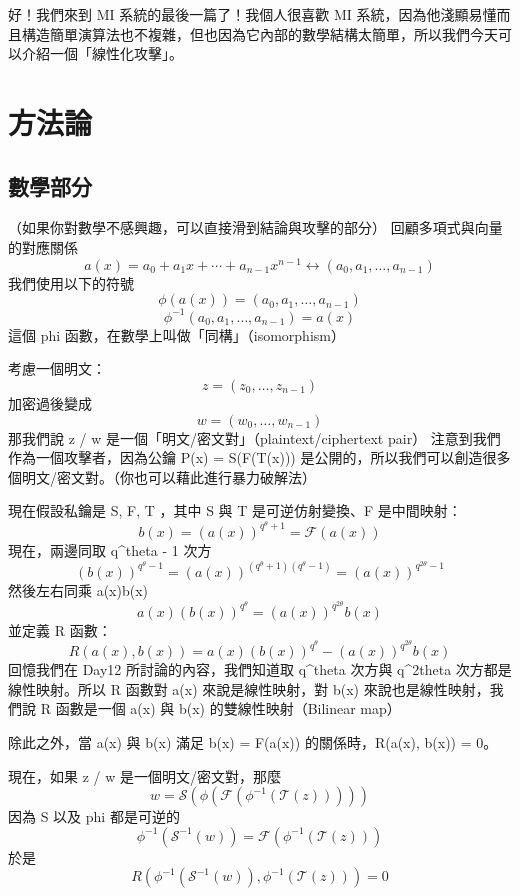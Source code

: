 \documentclass[
]{article}
\author{}
\date{}
\begin{document}
好！我們來到 MI 系統的最後一篇了！我個人很喜歡 MI
系統，因為他淺顯易懂而且構造簡單演算法也不複雜，但也因為它內部的數學結構太簡單，所以我們今天可以介紹一個「線性化攻擊」。

\hypertarget{ux65b9ux6cd5ux8ad6}{%
\section{方法論}\label{ux65b9ux6cd5ux8ad6}}

\hypertarget{ux6578ux5b78ux90e8ux5206}{%
\subsection{數學部分}\label{ux6578ux5b78ux90e8ux5206}}

（如果你對數學不感興趣，可以直接滑到結論與攻擊的部分）
回顧多項式與向量的對應關係 \[
a(x) = a_{0} +a_{1}x+\cdots  +a_{n-1}x^{n-1}
\leftrightarrow
(a_{0},a_{1},\dots,a_{n-1})
\] 我們使用以下的符號 \[
\phi(a(x)) = (a_{0},a_{1},\dots,a_{n-1})
\] \[
\phi^{-1}(a_{0},a_{1},\dots,a_{n-1})  = a(x)
\] 這個 phi 函數，在數學上叫做「同構」（isomorphism）

考慮一個明文： \[
z = (z_{0},\dots,z_{n-1})
\] 加密過後變成 \[
w = (w_{0},\dots,w_{n-1})
\] 那我們說 z / w 是一個「明文/密文對」（plaintext/ciphertext pair）
注意到我們作為一個攻擊者，因為公鑰 P(x) = S(F(T(x)))
是公開的，所以我們可以創造很多個明文/密文對。（你也可以藉此進行暴力破解法）

現在假設私鑰是 S, F, T ，其中 S 與 T 是可逆仿射變換、F 是中間映射： \[
b(x) = (a(x))^{q^{\theta}+1} = \mathcal{F}(a(x))
\] 現在，兩邊同取 q\^{}theta - 1 次方 \[
(b(x))^{q^{\theta}-1} = (a(x))^{(q^{\theta}+1)(q^{\theta}-1)} = (a(x))^{q^{2\theta}-1}
\] 然後左右同乘 a(x)b(x) \[
a(x)(b(x))^{q^{\theta}}
= (a(x))^{q^{2\theta}}b(x)
\] 並定義 R 函數： \[
R(a(x),b(x)) = a(x)(b(x))^{q^{\theta}}
- (a(x))^{q^{2\theta}}b(x)
\] 回憶我們在 Day12 所討論的內容，我們知道取 q\^{}theta 次方與
q\^{}2theta 次方都是線性映射。所以 R 函數對 a(x) 來說是線性映射，對 b(x)
來說也是線性映射，我們說 R 函數是一個 a(x) 與 b(x)
的雙線性映射（Bilinear map）

除此之外，當 a(x) 與 b(x) 滿足 b(x) = F(a(x)) 的關係時，R(a(x), b(x)) =
0。

現在，如果 z / w 是一個明文/密文對，那麼 \[
w = \mathcal{S}(\phi(\mathcal{F}(\phi^{-1}(\mathcal{T}(z)))))
\] 因為 S 以及 phi 都是可逆的 \[
\phi^{-1}(\mathcal{S}^{-1}(w) ) = 
\mathcal{F}(\phi^{-1}(\mathcal{T}(z)))
\] 於是 \[
R(\phi^{-1}(\mathcal{S}^{-1}(w)) , \phi^{-1}(\mathcal{T}(z))) = 0
\]
\end{document}

